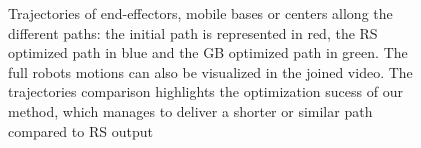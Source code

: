 \documentclass{tADR2e}
\begin{document}
\begin{figure}
{		\label{fig:trajectories:ur5}
	}
  \caption{Trajectories of end-effectors, mobile bases or centers allong the 
  different paths: the initial path is represented in red, the RS optimized path in 
  blue and the GB optimized path in green. The full robots 
  motions can also be visualized in the joined video. The trajectories comparison 
  highlights the optimization sucess of our method, which manages to deliver a 
  shorter or similar path compared to RS output}
  \label{fig:trajectories}
\end{figure}
\end{document}
